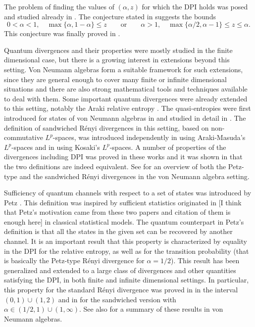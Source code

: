 \documentclass[12pt]{article}
\theoremstyle{definition}
\theoremstyle{remark}
\numberwithin{equation}{section}
\begin{document}
The problem of finding the values of $(\alpha,z)$ for which the DPI holds was posed and studied
already in \cite{audenaert2015alpha}. The conjecture stated in
\cite{carlen2018inequalities} suggests the bounds
\[
0<\alpha<1, \quad \max\{\alpha,1-\alpha\}\le z\qquad \text{or}\qquad \alpha>1,\quad
\max\{{\alpha/2},\alpha-1\}\le z\le \alpha.
\]
This conjecture was finally proved in \cite{zhang2020fromwyd}.


Quantum divergences and their properties were mostly studied in the finite dimensional
case, but there is a growing interest in extensions beyond this setting. Von Neumann
algebras form a suitable framework for such extensions, since they are general enough to
cover many finite or infinite dimensional situations and there are also strong mathematical
tools and techniques available to deal with them. Some important quantum divergences were
already extended to this setting, notably the Araki relative entropy \cite{araki1976relative}. The
quasi-entropies were first introduced for states of von Neumann algebras in
\cite{petz1985quasi} and studied in detail in \cite{hiai2018quantum}. The definition of sandwiched
R\'enyi divergences in this setting, based on non-commutative $L^p$-spaces,  was
introduced independently in \cite{berta2018renyi}  using Araki-Masuda's $L^p$-spaces and
in \cite{jencova2018renyi,jencova2021renyi} using Kosaki's $L^p$-spaces. A number of
properties of the divergences including DPI was proved in these works and it was shown in
\cite{jencova2018renyi} that the two definitions are indeed equivalent. See \cite{hiai2021quantum} for
an overview of both the Petz-type and the sandwiched R\'enyi divergences in the
von Neumann algebra setting.

Sufficiency of quantum channels with respect to a set of states was introduced by Petz
\cite{petz1986sufficient,petz1988sufficiency}. This definition was inspired by sufficient statistics
{\color{red}originated in \cite{halmos1949application,kullback1951oninformation}}
{\color{blue}[I think that Petz's motivation came from these two papers and citation of them is enough here]}
{in} classical statistical models. The quantum counterpart in Petz's definition is that all
the states in the given set can be recovered by another channel. It is an important result
that this property is characterized by equality in the DPI for the relative entropy, as well
as for the transition probability (that is basically the Petz-type R\'enyi divergence for
$\alpha=1/2$). This result has been generalized and extended to a large class of
divergences and other quantities satisfying the DPI, in both finite and infinite
dimensional settings. In particular, this property 
for the standard R\'enyi divergence was proved in \cite{hiai2017different} in the interval $(0,1)\cup(1,2)$
and in \cite{jencova2017preservation, jencova2018renyi, jencova2021renyi} for the sandwiched version
with $\alpha\in(1/2,1)\cup(1,\infty)$. See also \cite{hiai2021quantum} for a summary of these results
in von Neumann algebras.  
\end{document}
